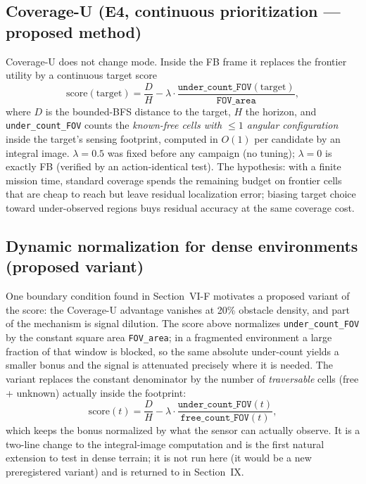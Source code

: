 \documentclass[journal]{IEEEtran}
\newcommand{\CU}{Coverage-U}
\begin{document}
\subsection{Coverage-U (E4, continuous prioritization --- proposed method)}
\CU{} does not change mode. Inside the FB frame it replaces the frontier
utility by a continuous target score
\begin{equation}
\mathrm{score}(\text{target}) = \frac{D}{H} - \lambda \cdot
\frac{\texttt{under\_count\_FOV}(\text{target})}{\texttt{FOV\_area}},
\end{equation}
where $D$ is the bounded-BFS distance to the target, $H$ the horizon, and
\texttt{under\_count\_FOV} counts the \emph{known-free cells with $\leq 1$
angular configuration} inside the target's sensing footprint, computed in
$O(1)$ per candidate by an integral image. $\lambda = 0.5$ was fixed before any
campaign (no tuning); $\lambda = 0$ is exactly FB (verified by an
action-identical test). The hypothesis: with a finite mission time, standard
coverage spends the remaining budget on frontier cells that are cheap to reach
but leave residual localization error; biasing target choice toward
under-observed regions buys residual accuracy at the same coverage cost.

\subsection{Dynamic normalization for dense environments (proposed variant)}
One boundary condition found in Section~VI-F motivates a proposed variant of
the score: the \CU{} advantage vanishes at 20\% obstacle density, and part of
the mechanism is signal dilution. The score above normalizes
\texttt{under\_count\_FOV} by the constant square area \texttt{FOV\_area}; in a
fragmented environment a large fraction of that window is blocked, so the same
absolute under-count yields a smaller bonus and the signal is attenuated
precisely where it is needed. The variant replaces the constant denominator by
the number of \emph{traversable} cells (free + unknown) actually inside the
footprint:
\begin{equation}
\mathrm{score}(t) = \frac{D}{H} - \lambda \cdot
\frac{\texttt{under\_count\_FOV}(t)}{\texttt{free\_count\_FOV}(t)},
\end{equation}
which keeps the bonus normalized by what the sensor can actually observe. It
is a two-line change to the integral-image computation and is the first natural
extension to test in dense terrain; it is not run here (it would be a new
preregistered variant) and is returned to in Section~IX.
\end{document}
